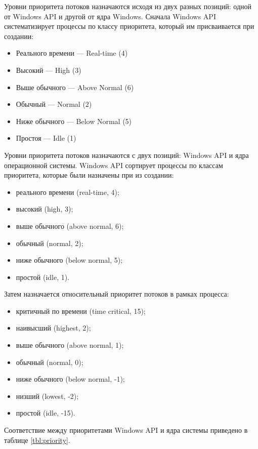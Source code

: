 Уровни приоритета потоков назначаются исходя из двух разных позиций: одной от Windows API и другой от ядра Windows. Сначала Windows API систематизирует процессы по классу приоритета, который им присваивается при создании:
\begin{itemize}
	\item Реального времени — Real-time (4)
	\item Высокий — High (3)
	\item Выше обычного — Above Normal (6)
	\item Обычный — Normal (2)
	\item Ниже обычного — Below Normal (5)
	\item Простоя — Idle (1)
\end{itemize}

Уровни приоритета потоков назначаются с двух позиций: Windows API и ядра операционной системы. Windows API сортирует процессы по классам приоритета, которые были назначены при из создании:

\begin{itemize}
	\item реального времени (real-time, 4);
	\item высокий (high, 3);
	\item выше обычного (above normal, 6);
	\item обычный (normal, 2);
	\item ниже обычного (below normal, 5);
	\item простой (idle, 1).
\end{itemize}

Затем назначается относительный приоритет потоков в рамках процесса:

\begin{itemize}
	\item критичный по времени (time critical, 15);
	\item наивысший (highest, 2);
	\item выше обычного (above normal, 1);
	\item обычный (normal, 0);
	\item ниже обычного (below normal, -1);
	\item низший (lowest, -2);
	\item простой (idle, -15).
\end{itemize}

Соответствие между приоритетами Windows API и ядра системы приведено в таблице \ref{tbl:priority}.


